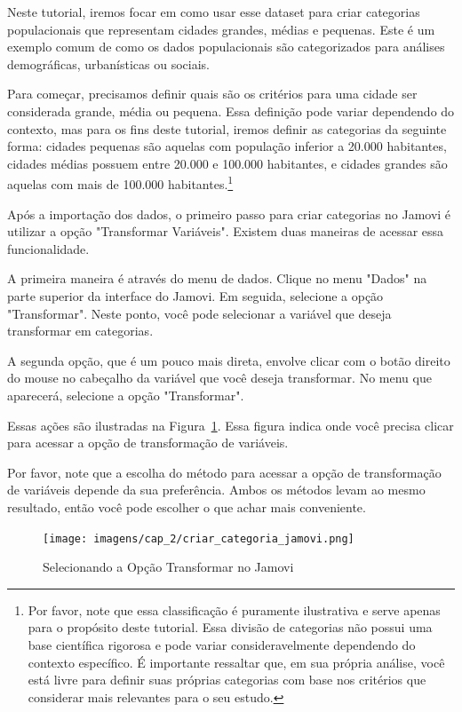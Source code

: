 Neste tutorial, iremos focar em como usar esse dataset para criar categorias populacionais que representam cidades grandes, médias e pequenas. Este é um exemplo comum de como os dados populacionais são categorizados para análises demográficas, urbanísticas ou sociais.

Para começar, precisamos definir quais são os critérios para uma cidade ser considerada grande, média ou pequena. Essa definição pode variar dependendo do contexto, mas para os fins deste tutorial, iremos definir as categorias da seguinte forma: cidades pequenas são aquelas com população inferior a 20.000 habitantes, cidades médias possuem entre 20.000 e 100.000 habitantes, e cidades grandes são aquelas com mais de 100.000 habitantes.\footnote{Por favor, note que essa classificação é puramente ilustrativa e serve apenas para o propósito deste tutorial. Essa divisão de categorias não possui uma base científica rigorosa e pode variar consideravelmente dependendo do contexto específico. É importante ressaltar que, em sua própria análise, você está livre para definir suas próprias categorias com base nos critérios que considerar mais relevantes para o seu estudo.}

Após a importação dos dados, o primeiro passo para criar categorias no Jamovi é utilizar a opção "Transformar Variáveis". Existem duas maneiras de acessar essa funcionalidade.

A primeira maneira é através do menu de dados. Clique no menu "Dados" na parte superior da interface do Jamovi. Em seguida, selecione a opção "Transformar". Neste ponto, você pode selecionar a variável que deseja transformar em categorias.

A segunda opção, que é um pouco mais direta, envolve clicar com o botão direito do mouse no cabeçalho da variável que você deseja transformar. No menu que aparecerá, selecione a opção "Transformar".

Essas ações são ilustradas na Figura~\ref{fig:criar_categoria_jamovi}. Essa figura indica onde você precisa clicar para acessar a opção de transformação de variáveis.

Por favor, note que a escolha do método para acessar a opção de transformação de variáveis depende da sua preferência. Ambos os métodos levam ao mesmo resultado, então você pode escolher o que achar mais conveniente.

\begin{figure}[H]
    \centering
    \caption{Selecionando a Opção Transformar no Jamovi}
    \texttt{[image: imagens/cap\_2/criar\_categoria\_jamovi.png]}
    \label{fig:criar_categoria_jamovi}
\end{figure}

